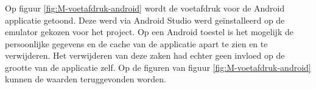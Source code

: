 \subsubsection{}
\label{sec:M-test-voetafdruk-android}
Op figuur \ref{fig:M-voetafdruk-android} wordt de voetafdruk voor de Android applicatie getoond. Deze werd via Android Studio werd geïnstalleerd op de emulator gekozen voor het project. Op een Android toestel is het mogelijk de persoonlijke gegevens en de cache van de applicatie apart te zien en te verwijderen. Het verwijderen van deze zaken had echter geen invloed op de grootte van de applicatie zelf. Op de figuren van figuur \ref{fig:M-voetafdruk-android} kunnen de waarden teruggevonden worden.

\begin{figure}
    \centering
    \qquad
    

\end{figure}
